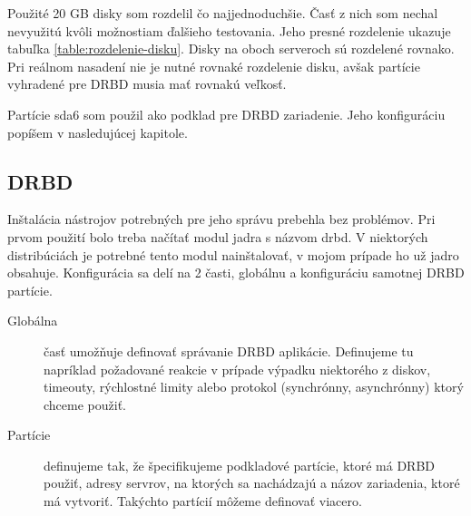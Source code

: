 Použité 20 GB disky som rozdelil čo najjednoduchšie. Časť z nich som nechal nevyužitú kvôli možnostiam ďalšieho testovania. Jeho presné rozdelenie ukazuje tabuľka \ref{table:rozdelenie-disku}. Disky na oboch serveroch sú rozdelené rovnako. Pri reálnom nasadení nie je nutné rovnaké rozdelenie disku, avšak partície vyhradené pre DRBD musia mať rovnakú veľkosť.


Partície sda6 som použil ako podklad pre DRBD zariadenie. Jeho konfiguráciu popíšem v nasledujúcej kapitole.

\subsection{DRBD}
Inštalácia nástrojov potrebných pre jeho správu prebehla bez problémov. Pri prvom použití bolo treba načítať modul jadra s názvom drbd. V niektorých distribúciách je potrebné tento modul nainštalovať, v mojom prípade ho už jadro obsahuje. Konfigurácia sa delí na 2 časti, globálnu a konfiguráciu samotnej DRBD partície.

\begin{description}
	\item[Globálna] časť umožňuje definovať správanie DRBD aplikácie. Definujeme tu napríklad požadované reakcie v prípade výpadku niektorého z diskov, timeouty, rýchlostné limity alebo protokol (synchrónny, asynchrónny) ktorý chceme použiť.
	\item[Partície] definujeme tak, že špecifikujeme podkladové partície, ktoré má DRBD použiť, adresy servrov, na ktorých sa nachádzajú a názov zariadenia, ktoré má vytvoriť. Takýchto partícií môžeme definovať viacero.
\end{description}

